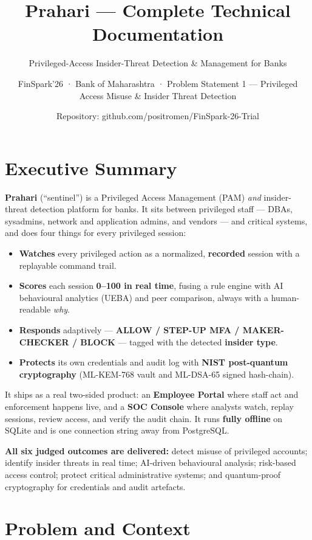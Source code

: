 \documentclass[
]{article}
\title{Prahari --- Complete Technical Documentation}
\subtitle{Privileged-Access Insider-Threat Detection \& Management for
Banks}
\author{FinSpark'26 · Bank of Maharashtra · Problem Statement 1 ---
Privileged Access Misuse \& Insider Threat Detection}
\date{Repository: github.com/positromen/FinSpark-26-Trial}
\providecommand{\tightlist}{%
  \setlength{\itemsep}{0pt}\setlength{\parskip}{0pt}}
\begin{document}
\maketitle

{
\setcounter{tocdepth}{3}
\tableofcontents
}
\section{Executive Summary}\label{executive-summary}

\textbf{Prahari} (``sentinel'') is a Privileged Access Management (PAM)
\emph{and} insider-threat detection platform for banks. It sits between
privileged staff --- DBAs, sysadmins, network and application admins,
and vendors --- and critical systems, and does four things for every
privileged session:

\begin{itemize}
\tightlist
\item
  \textbf{Watches} every privileged action as a normalized,
  \textbf{recorded} session with a replayable command trail.
\item
  \textbf{Scores} each session \textbf{0--100 in real time}, fusing a
  rule engine with AI behavioural analytics (UEBA) and peer comparison,
  always with a human-readable \emph{why}.
\item
  \textbf{Responds} adaptively --- \textbf{ALLOW / STEP-UP MFA /
  MAKER-CHECKER / BLOCK} --- tagged with the detected \textbf{insider
  type}.
\item
  \textbf{Protects} its own credentials and audit log with \textbf{NIST
  post-quantum cryptography} (ML-KEM-768 vault and ML-DSA-65 signed
  hash-chain).
\end{itemize}

It ships as a real two-sided product: an \textbf{Employee Portal} where
staff act and enforcement happens live, and a \textbf{SOC Console} where
analysts watch, replay sessions, review access, and verify the audit
chain. It runs \textbf{fully offline} on SQLite and is one connection
string away from PostgreSQL.

\textbf{All six judged outcomes are delivered:} detect misuse of
privileged accounts; identify insider threats in real time; AI-driven
behavioural analysis; risk-based access control; protect critical
administrative systems; and quantum-proof cryptography for credentials
and audit artefacts.

\section{Problem and Context}\label{problem-and-context}
\end{document}
